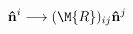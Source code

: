 \begin{equation}
\mathbf{\hat{n}}^i\longrightarrow (\M{R})_{ij}\mathbf{\hat{n}}^j
\label{2.22b}
\end{equation}

